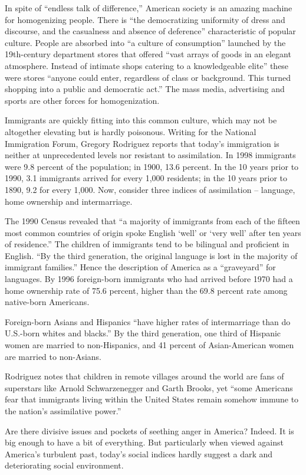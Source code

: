In spite of ``endless talk of difference,'' American society is an amazing machine for homogenizing people. There is ``the democratizing uniformity of dress and discourse, and the casualness and absence of deference'' characteristic of popular culture. People are absorbed into ``a culture of consumption'' launched by the 19th-century department stores that offered ``vast arrays of goods in an elegant atmosphere. Instead of intimate shops catering to a knowledgeable elite'' these were stores ``anyone could enter, regardless of class or background. This turned shopping into a public and democratic act.'' The mass media, advertising and sports are other forces for homogenization.


Immigrants are quickly fitting into this common culture, which may not be altogether elevating but is hardly poisonous. Writing for the National Immigration Forum, Gregory Rodriguez reports that today's immigration is neither at unprecedented levels nor resistant to assimilation. In 1998 immigrants were 9.8 percent of the population; in 1900, 13.6 percent. In the 10 years prior to 1990, 3.1 immigrants arrived for every 1,000 residents; in the 10 years prior to 1890, 9.2 for every 1,000. Now, consider three indices of assimilation – language, home ownership and intermarriage.


The 1990 Census revealed that ``a majority of immigrants from each of the fifteen most common countries of origin spoke English `well' or `very well' after ten years of residence.'' The children of immigrants tend to be bilingual and proficient in English. ``By the third generation, the original language is lost in the majority of immigrant families.'' Hence the description of America as a ``graveyard'' for languages. By 1996 foreign-born immigrants who had arrived before 1970 had a home ownership rate of 75.6 percent, higher than the 69.8 percent rate among native-born Americans.


Foreign-born Asians and Hispanics ``have higher rates of intermarriage than do U.S.-born whites and blacks.'' By the third generation, one third of Hispanic women are married to non-Hispanics, and 41 percent of Asian-American women are married to non-Asians.


Rodriguez notes that children in remote villages around the world are fans of superstars like Arnold Schwarzenegger and Garth Brooks, yet ``some Americans fear that immigrants living within the United States remain somehow immune to the nation's assimilative power.''


Are there divisive issues and pockets of seething anger in America? Indeed. It is big enough to have a bit of everything. But particularly when viewed against America's turbulent past, today's social indices hardly suggest a dark and deteriorating social environment.